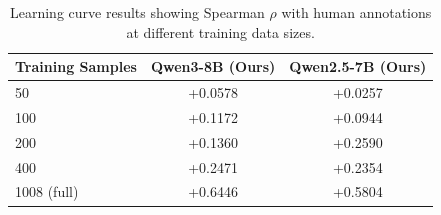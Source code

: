 \begin{table}[t]
\centering
\caption{Learning curve results showing Spearman $\rho$ with human annotations at different training data sizes.}
\label{tab:learning_curve}
\begin{tabular}{lcc}
\toprule
Training Samples & Qwen3-8B (Ours) & Qwen2.5-7B (Ours) \\
\midrule
50 & +0.0578 & +0.0257 \\
100 & +0.1172 & +0.0944 \\
200 & +0.1360 & +0.2590 \\
400 & +0.2471 & +0.2354 \\
1008 (full) & +0.6446 & +0.5804 \\
\bottomrule
\end{tabular}
\end{table}
